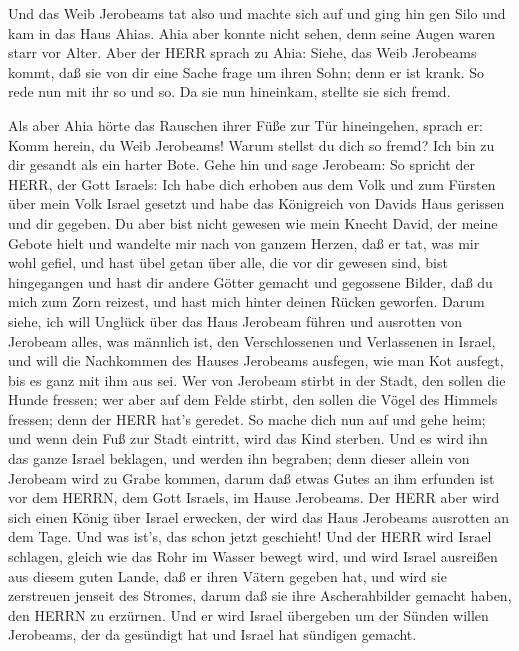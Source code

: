  Und das Weib Jerobeams tat also und machte sich auf und
ging hin gen Silo und kam in das Haus Ahias. Ahia aber konnte nicht
sehen, denn seine Augen waren starr vor Alter.  Aber der
HERR sprach zu Ahia: Siehe, das Weib Jerobeams kommt, daß sie von dir
eine Sache frage um ihren Sohn; denn er ist krank. So rede nun mit ihr
so und so. Da sie nun hineinkam, stellte sie sich fremd.

 Als aber Ahia hörte das Rauschen ihrer Füße zur Tür
hineingehen, sprach er: Komm herein, du Weib Jerobeams! Warum stellst du
dich so fremd? Ich bin zu dir gesandt als ein harter Bote. 
Gehe hin und sage Jerobeam: So spricht der HERR, der Gott Israels: Ich
habe dich erhoben aus dem Volk und zum Fürsten über mein Volk Israel
gesetzt  und habe das Königreich von Davids Haus gerissen
und dir gegeben. Du aber bist nicht gewesen wie mein Knecht David, der
meine Gebote hielt und wandelte mir nach von ganzem Herzen, daß er tat,
was mir wohl gefiel,  und hast übel getan über alle, die vor
dir gewesen sind, bist hingegangen und hast dir andere Götter gemacht
und gegossene Bilder, daß du mich zum Zorn reizest, und hast mich hinter
deinen Rücken geworfen.  Darum siehe, ich will Unglück über
das Haus Jerobeam führen und ausrotten von Jerobeam alles, was männlich
ist, den Verschlossenen und Verlassenen in Israel, und will die
Nachkommen des Hauses Jerobeams ausfegen, wie man Kot ausfegt, bis es
ganz mit ihm aus sei.  Wer von Jerobeam stirbt in der
Stadt, den sollen die Hunde fressen; wer aber auf dem Felde stirbt, den
sollen die Vögel des Himmels fressen; denn der HERR hat's geredet.
 So mache dich nun auf und gehe heim; und wenn dein Fuß zur
Stadt eintritt, wird das Kind sterben.  Und es wird ihn das
ganze Israel beklagen, und werden ihn begraben; denn dieser allein von
Jerobeam wird zu Grabe kommen, darum daß etwas Gutes an ihm erfunden ist
vor dem HERRN, dem Gott Israels, im Hause Jerobeams.  Der
HERR aber wird sich einen König über Israel erwecken, der wird das Haus
Jerobeams ausrotten an dem Tage. Und was ist's, das schon jetzt
geschieht!  Und der HERR wird Israel schlagen, gleich wie
das Rohr im Wasser bewegt wird, und wird Israel ausreißen aus diesem
guten Lande, daß er ihren Vätern gegeben hat, und wird sie zerstreuen
jenseit des Stromes, darum daß sie ihre Ascherahbilder gemacht haben,
den HERRN zu erzürnen.  Und er wird Israel übergeben um der
Sünden willen Jerobeams, der da gesündigt hat und Israel hat sündigen
gemacht.

